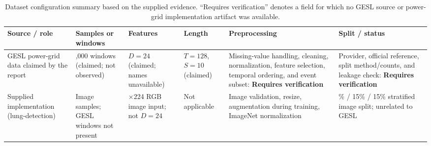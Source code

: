 \documentclass[12pt,a4paper]{report}
\begin{document}
\begin{table}[H]
\centering
\scriptsize
\caption{Dataset configuration summary based on the supplied evidence. ``Requires verification'' denotes a field for which no GESL source or power-grid implementation artifact was available.}
\label{tab:dataset_verification_summary}
\begin{tabularx}{\textwidth}{>{\raggedright\arraybackslash}p{2.0cm} >{\raggedright\arraybackslash}p{2.1cm} >{\raggedright\arraybackslash}p{1.3cm} >{\raggedright\arraybackslash}p{1.4cm} X >{\raggedright\arraybackslash}p{2.6cm}}
\toprule
\textbf{Source / role} & \textbf{Samples or windows} & \textbf{Features} & \textbf{Length} & \textbf{Preprocessing} & \textbf{Split / status} \\
\midrule
GESL power-grid data claimed by the report & 15,000 windows (claimed; not observed) & $D=24$ (claimed; names unavailable) & $T=128$, $S=10$ (claimed) & Missing-value handling, cleaning, normalization, feature selection, temporal ordering, and event subset: \textbf{Requires verification} & Provider, official reference, split method/counts, and leakage check: \textbf{Requires verification} \\
\addlinespace
Supplied implementation (lung-detection) & Image samples; GESL windows not present & 224$\times$224 RGB image input; not $D=24$ & Not applicable & Image validation, resize, augmentation during training, ImageNet normalization & 70\% / 15\% / 15\% stratified image split; unrelated to GESL \\
\bottomrule
\end{tabularx}
\end{table}
\end{document}
